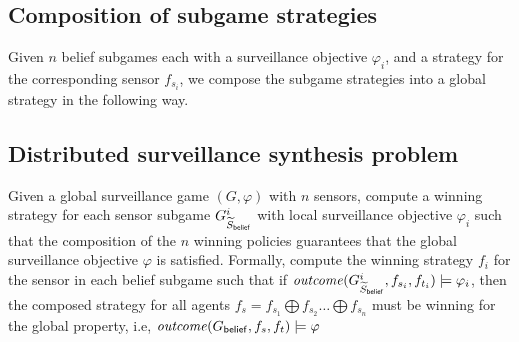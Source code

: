 \subsection{Composition of subgame strategies}
Given $n$ belief subgames each with a surveillance objective $\varphi_i$, and a strategy for the corresponding sensor $f_{s_i}$, we compose the subgame strategies into a global strategy in the following way.

 




\subsection{Distributed surveillance synthesis problem}
Given a global surveillance game $(G,\varphi)$ with $n$ sensors, compute a winning strategy for each sensor subgame $G^{i}_{\widetilde{S}_{\mathsf{belief}}}$ with local surveillance objective $\varphi_i$ such that the composition of the $n$ winning policies guarantees that the global surveillance objective $\varphi$ is satisfied. Formally, compute the winning strategy $f_i$ for the sensor in each belief subgame such that if $\mathit{outcome}(G^{i}_{\widetilde{S}_{\mathsf{belief}}},f_{s_i},f_{t_i}) \models \varphi_i$, then the composed strategy for all agents $f_s = f_{s_1} \bigoplus f_{s_2} \dots \bigoplus f_{s_n}$ must be winning for the global property, i.e, $\mathit{outcome}(G_{\mathsf{belief}},f_{s},f_{t}) \models \varphi$





